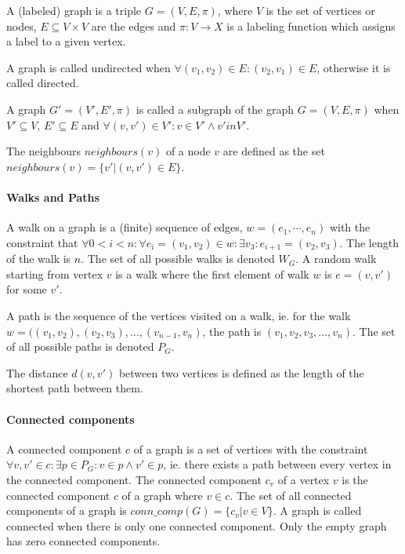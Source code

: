


A (labeled) graph is a triple $G = (V, E, \pi)$, where $V$ is the set of vertices or nodes, $E \subseteq V \times V$ are the edges and $\pi: V \to X$ is a labeling function which assigns a label to a given vertex.

A graph is called undirected when $\forall (v_1, v_2) \in E: (v_2, v_1) \in E$, otherwise it is called directed.

A graph $G'=(V', E', \pi)$ is called a subgraph of the graph $G = (V, E, \pi)$ when $V' \subseteq V$, $E' \subseteq E$ and $\forall (v, v') \in V': v \in V' \land v' in V'$.

The neighbours $neighbours(v)$ of a node $v$ are defined as the set $neighbours(v) = \{v' | (v, v') \in E \}$.

\paragraph{Walks and Paths}
A walk on a graph is a (finite) sequence of edges, $w = (e_1, \cdots, e_n)$ with the constraint that $\forall 0 < i < n: \forall e_i = (v_1, v_2) \in w: \exists v_3: e_{i + 1} = (v_2, v_3)$. The length of the walk is $n$.
The set of all possible walks is denoted $W_G$.
A random walk starting from vertex $v$ is a walk where the first element of walk $w$ is $e = (v, v')$ for some $v'$.

A path is the sequence of the vertices visited on a walk, ie. for the walk $w = ((v_1, v_2), (v_2, v_3), \dots, (v_{n-1}, v_n)$, the path is $(v_1, v_2, v_3, \dots, v_n)$.
The set of all possible paths is denoted $P_G$.

The distance $d(v, v')$ between two vertices is defined as the length of the shortest path between them.

\paragraph{Connected components}
A connected component $c$ of a graph is a set of vertices with the constraint $\forall v, v' \in c: \exists p \in P_G: v \in p \land v' \in p$, ie. there exists a path between every vertex in the connected component.
The connected component $c_v$ of a vertex $v$ is the connected component $c$ of a graph where $v \in c$.
The set of all connected components of a graph is $conn\_comp(G) = \{ c_v | v \in V \}$. A graph is called connected when there is only one connected component. Only the empty graph has zero connected components.

